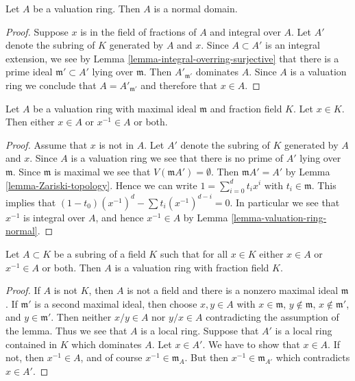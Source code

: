 \begin{lemma}
\label{lemma-valuation-ring-normal}
Let $A$ be a valuation ring.
Then $A$ is a normal domain.
\end{lemma}

\begin{proof}
Suppose $x$ is in the field of fractions of $A$ and integral over $A$.
Let $A'$ denote the subring of $K$ generated by $A$ and $x$.
Since $A\subset A'$ is an integral extension, we see by
Lemma \ref{lemma-integral-overring-surjective} that there is
a prime ideal $\mathfrak m' \subset A'$ lying over
$\mathfrak m$. Then $A'_{\mathfrak m'}$ dominates
$A$. Since $A$ is a valuation ring we conclude that $A=A'_{\mathfrak m'}$
and therefore that $x\in A$.
\end{proof}


\begin{lemma}
\label{lemma-valuation-ring-x-or-x-inverse}
Let $A$ be a valuation ring with maximal ideal $\mathfrak m$ and
fraction field $K$.
Let $x \in K$. Then either $x \in A$ or $x^{-1} \in A$ or both.
\end{lemma}

\begin{proof}
Assume that $x$ is not in $A$.
Let $A'$ denote the subring of $K$ generated by $A$ and $x$.
Since $A$ is a valuation ring we see that there is no prime
of $A'$ lying over $\mathfrak m$. Since $\mathfrak m$ is maximal
we see that $V(\mathfrak m A') = \emptyset$. Then $\mathfrak m A' = A'$
by Lemma \ref{lemma-Zariski-topology}.
Hence we can write
$1 = \sum_{i = 0}^d t_i x^i$ with $t_i \in \mathfrak m$.
This implies that $(1 - t_0) (x^{-1})^d - \sum t_i (x^{-1})^{d - i} = 0$.
In particular we see that $x^{-1}$ is integral over $A$, and hence
$x^{-1} \in A$ by
Lemma \ref{lemma-valuation-ring-normal}.
\end{proof}

\begin{lemma}
\label{lemma-x-or-x-inverse-valuation-ring}
Let $A \subset K$ be a subring of a field $K$ such that for all
$x \in K$ either $x \in A$ or $x^{-1} \in A$ or both.
Then $A$ is a valuation ring with fraction field $K$.
\end{lemma}

\begin{proof}
If $A$ is not $K$, then $A$ is not a field and there is a nonzero
maximal ideal $\mathfrak m$.
If $\mathfrak m'$ is a second maximal ideal, then choose $x, y \in A$
with $x \in \mathfrak m$, $y \not \in \mathfrak m$,
$x \not \in \mathfrak m'$, and $y \in \mathfrak m'$.
Then neither $x/y \in A$ nor $y/x \in A$
contradicting the assumption of the lemma. Thus we see that $A$ is
a local ring. Suppose that $A'$ is a local ring contained in $K$ which
dominates $A$. Let $x \in A'$. We have to show that $x \in A$. If not, then
$x^{-1} \in A$, and of course $x^{-1} \in \mathfrak m_A$. But then
$x^{-1} \in \mathfrak m_{A'}$ which contradicts $x \in A'$.
\end{proof}

